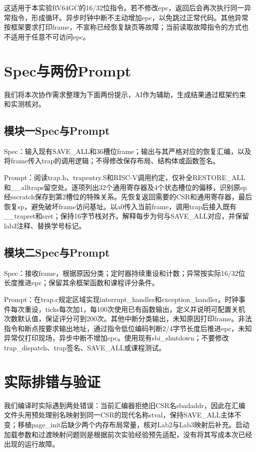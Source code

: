 \documentclass[UTF8,a4paper,10pt]{ctexart}
\begin{document}
这适用于本实验RV64GC的16/32位指令。若不修改epc，返回后会再次执行同一异常指令，形成循环。异步时钟中断不主动增加epc，以免跳过正常代码。其他异常按框架要求打印frame，不宣称已经恢复缺页等故障；当前读取故障指令的方式也不适用于任意不可访问epc。


\section{Spec与两份Prompt}

我们将本次协作需求整理为下面两份提示，AI作为辅助，生成结果通过框架约束和实测核对。


\subsection{模块一Spec与Prompt}

Spec：输入现有SAVE\_ALL和36槽位frame；输出与其严格对应的恢复汇编，以及将frame传入trap的调用逻辑；不得修改保存布局、结构体或函数签名。


Prompt：阅读trap.h、trapentry.S和RISC-V调用约定，仅补全RESTORE\_ALL和\_\_alltraps留空处。逐项列出32个通用寄存器及4个状态槽位的偏移，识别原sp经sscratch保存到第2槽位的特殊关系。先恢复返回需要的CSR和通用寄存器，最后恢复sp，避免破坏frame访问基址。以a0传入当前frame，调用trap后接入既有\_\_trapret和sret；保持16字节栈对齐。解释每步为何与SAVE\_ALL对应，并保留lab3注释、替换学号标记。


\subsection{模块二Spec与Prompt}

Spec：接收frame，根据原因分类；定时器持续重设和计数；异常按实际16/32位长度推进epc；保留其余框架函数和课程评分条件。


Prompt：在trap.c规定区域实现interrupt\_handler和exception\_handler。时钟事件每次重设，ticks每次加1，每100次使用已有函数输出，定义并说明可配置关机次数默认值，保证评分可到200次。其他中断分类输出，未知原因打印frame。非法指令和断点按要求输出地址，通过指令低位编码判断2/4字节长度后推进epc，未知异常仅打印现场，异步中断不增加epc。使用现有sbi\_shutdown；不要修改trap\_dispatch、trap签名、SAVE\_ALL或课程测试。


\section{实际排错与验证}

我们编译时实际遇到两处错误：当前汇编器拒绝旧CSR名sbadaddr，因此在汇编文件头用预处理别名映射到同一CSR的现代名称stval，保持SAVE\_ALL主体不变；移植page\_init后缺少两个内存布局常量，核对Lab2与Lab3映射后补充。启动加载参数和过渡映射问题则是根据前次实验经验预先适配，没有将其写成本次已经出现的运行故障。
\end{document}

